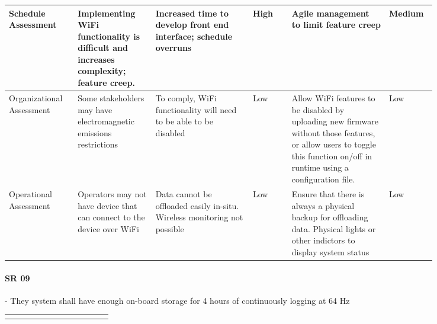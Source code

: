 \begin{landscape}
{\begin{longtable}{| p{0.12\linewidth} | p{0.16\linewidth} |  p{0.20\linewidth} | p{0.08\linewidth} | p{0.20\linewidth} | p{0.08\linewidth} |}
	\hline
	Schedule \newline Assessment & Implementing WiFi functionality is difficult and increases complexity; feature creep. & Increased time to develop front end interface; schedule overruns & \cellcolor{red} High & Agile management to limit feature creep & \cellcolor{yellow} Medium \\
	\hline
	Organizational \newline Assessment & Some stakeholders may have electromagnetic emissions restrictions & To comply, WiFi functionality will need to be able to be disabled & \cellcolor{green} Low & Allow WiFi features to be disabled by uploading new firmware without those features, or allow users to toggle this function on/off in runtime using a configuration file. & \cellcolor{green} Low \\
	\hline
	Operational \newline Assessment & Operators may not have device that can connect to the device over WiFi & Data cannot be offloaded easily in-situ. \newline Wireless monitoring not possible & \cellcolor{green} Low & Ensure that there is always a physical backup for offloading data. \newline Physical lights or other indictors to display system status & \cellcolor{green} Low
	\label{tab:sr08_feasibility}
\end{longtable}
}
\newpage




\paragraph*{SR 09} - They system shall have enough on-board storage for 4 hours of continuously logging at 64 Hz

{\fontsize{8pt}{8pt}\selectfont
\begin{longtable}{| p{0.12\linewidth} | p{0.16\linewidth} |  p{0.20\linewidth} | p{0.08\linewidth} | p{0.20\linewidth} | p{0.08\linewidth} |}
	\hline \endlastfoot
	

\end{longtable}}
\end{landscape}
